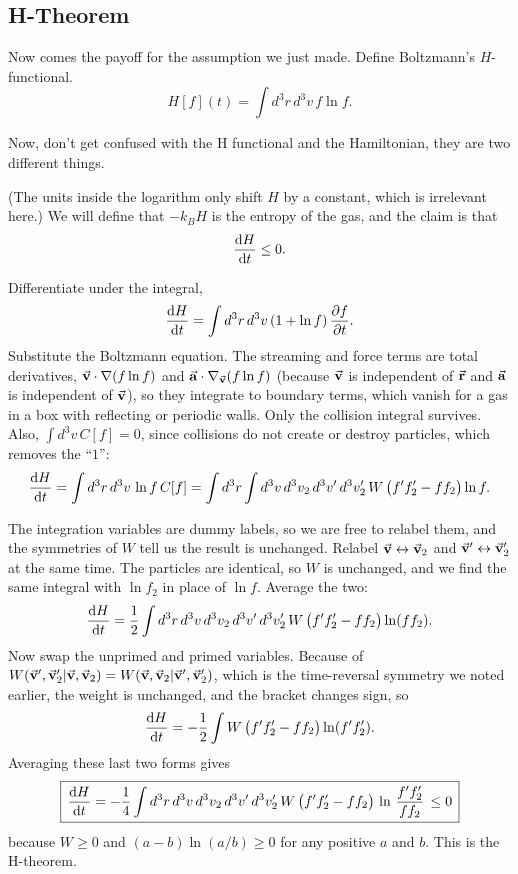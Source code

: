 \subsection{H-Theorem}

Now comes the payoff for the assumption we just made. Define Boltzmann's $H$-functional.
\[
H[f](t) = \int d^3r\,d^3v\,  f\ln f .
\]

Now, don't get confused with the H functional and the Hamiltonian, they are two different things.

(The units inside the logarithm only shift $H$ by a constant, which is irrelevant here.) We will define that $-k_B H$ is the entropy of the gas, and the claim is that
\[
\dv{H}{t}\le 0 .
\]

Differentiate under the integral,
\[
\dv{H}{t} = \int d^3r\,d^3v\, (1+\ln f)\,\pdv{f}{t}.
\]
Substitute the Boltzmann equation. The streaming and force terms are total derivatives, $\va v\cdot\nabla(f\ln f)$ and $\va a\cdot\nabla_{\va v}(f\ln f)$ (because $\va v$ is independent of $\va r$ and $\va a$ is independent of $\va v$), so they integrate to boundary terms, which vanish for a gas in a box with reflecting or periodic walls. Only the collision integral survives. Also, $\int d^3v\,C[f]=0$, since collisions do not create or destroy particles, which removes the ``$1$'':
\[
\dv{H}{t} = \int d^3r\,d^3v\, \ln f\, C[f] = \int d^3r\int d^3v\,d^3v_2\,d^3v'\,d^3v_2'\, W\,\big(f'f_2'-ff_2\big)\ln f .
\]

The integration variables are dummy labels, so we are free to relabel them, and the symmetries of $W$ tell us the result is unchanged. Relabel $\va v\leftrightarrow\va v_2$ and $\va v'\leftrightarrow\va v_2'$ at the same time. The particles are identical, so $W$ is unchanged, and we find the same integral with $\ln f_2$ in place of $\ln f$. Average the two:
\[
\dv{H}{t} = \frac12\int d^3r\,d^3v\,d^3v_2\,d^3v'\,d^3v_2'\, W\,\big(f'f_2'-ff_2\big)\ln(ff_2).
\]
Now swap the unprimed and primed variables. Because of $W(\va v',\va v_2'|\va v,\va v_2)=W(\va v,\va v_2|\va v',\va v_2')$, which is the time-reversal symmetry we noted earlier,  the weight is unchanged, and the bracket changes sign, so
\[
\dv{H}{t} = -\frac12\int W\,\big(f'f_2'-ff_2\big)\ln(f'f_2').
\]
Averaging these last two forms gives
\[
\boxed{\, \dv{H}{t} = -\frac14\int d^3r\,d^3v\,d^3v_2\,d^3v'\,d^3v_2'\, W\, \big(f'f_2'-ff_2\big)\,\ln \, \frac{f'f_2'}{ff_2}\, \le 0\, }
\]
because $W\ge0$ and $(a-b)\ln(a/b)\ge0$ for any positive $a$ and $b$. This is the H-theorem.


